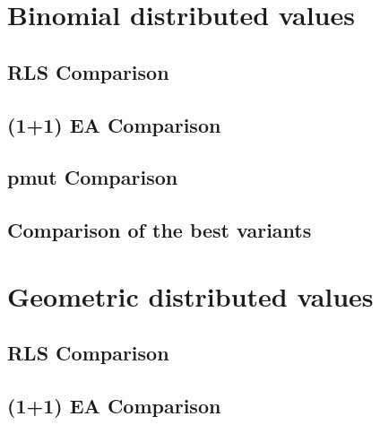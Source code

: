 \section{Binomial distributed values}

\subsection{RLS Comparison}





\subsection{(1+1) EA Comparison}





\subsection{pmut Comparison}





\subsection{Comparison of the best variants}





\section{Geometric distributed values}

\subsection{RLS Comparison}





\subsection{(1+1) EA Comparison}


